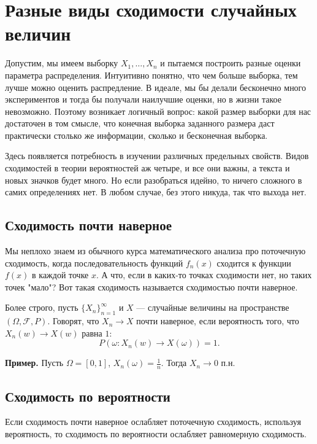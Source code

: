 \documentclass[a4paper,12pt]{article}
\newcommand{\braces}[1]{\left(#1\right)}
\newcounter{th-counter}
\newcommand{\ex}{\par\noindent
	\textbf{Пример.} }
\begin{document}
\section*{Разные виды сходимости случайных величин} 

Допустим, мы имеем выборку $X_1, \ldots, X_n$ и пытаемся построить разные оценки параметра распределения. Интуитивно понятно, что чем больше выборка, тем лучше можно оценить распредление. В идеале, мы бы делали бесконечно много экспериментов и тогда бы получали наилучшие оценки, но в жизни такое невозможно. Поэтому возникает логичный вопрос: какой размер выборки для нас достаточен в том смысле, что конечная выборка заданного размера даст практически столько же информации, сколько и бесконечная выборка.

Здесь появляется потребность в изучении различных предельных свойств. Видов сходимостей в теории вероятностей аж четыре, и все они важны, а текста и новых значков будет много. Но если разобраться идейно, то ничего сложного в самих определениях нет. В любом случае, без этого никуда, так что выхода нет.

\subsection*{Сходимость почти наверное} 
Мы неплохо знаем из обычного курса математического анализа про поточечную сходимость, когда последовательность функций $f_n(x)$ сходится к функции $f(x)$ в каждой точке $x$. А что, если в каких-то точках сходимости нет, но таких точек "мало"? Вот такая сходимость называется сходимостью почти наверное.

Более строго, пусть $\{X_n\}_{n=1}^\infty$ и $X$ --- случайные величины на пространстве $(\Omega, \mathcal{F}, P)$. Говорят, что $X_n \rightarrow X$ почти наверное, если вероятность того, что $X_n(w) \rightarrow X(w)$ равна $1$:
$$P\braces{\omega : X_n(w) \rightarrow X(\omega)} = 1.$$

\ex Пусть $\Omega = [0,1]$, $X_n(\omega) = \frac{1}{n}$. Тогда $X_n \rightarrow 0$ п.н.

\subsection*{Сходимость по вероятности} 
Если сходимость почти наверное ослабляет поточечную сходимость, используя вероятность, то сходимость по вероятности ослабляет равномерную сходимость.
\end{document}
